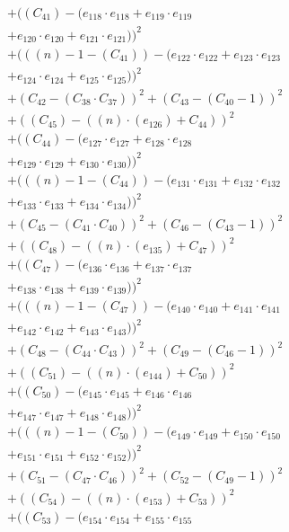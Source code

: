 \documentclass[10pt, a4paper]{article}
\begin{document}
\begin{align*}
& + ((C_{41}) - (e_{118} \cdot e_{118} + e_{119} \cdot e_{119} \\
& + e_{120} \cdot e_{120} + e_{121} \cdot e_{121}))^{2} \\
& + (((n) - 1 - (C_{41})) - (e_{122} \cdot e_{122} + e_{123} \cdot e_{123} \\
& + e_{124} \cdot e_{124} + e_{125} \cdot e_{125}))^{2} \\
& + (C_{42} - (C_{38}  \cdot  C_{37}))^{2} + (C_{43} - (C_{40} - 1))^{2} \\
& + ((C_{45}) - ((n)  \cdot  (e_{126}) + C_{44}))^{2} \\
& + ((C_{44}) - (e_{127} \cdot e_{127} + e_{128} \cdot e_{128} \\
& + e_{129} \cdot e_{129} + e_{130} \cdot e_{130}))^{2} \\
& + (((n) - 1 - (C_{44})) - (e_{131} \cdot e_{131} + e_{132} \cdot e_{132} \\
& + e_{133} \cdot e_{133} + e_{134} \cdot e_{134}))^{2} \\
& + (C_{45} - (C_{41}  \cdot  C_{40}))^{2} + (C_{46} - (C_{43} - 1))^{2} \\
& + ((C_{48}) - ((n)  \cdot  (e_{135}) + C_{47}))^{2} \\
& + ((C_{47}) - (e_{136} \cdot e_{136} + e_{137} \cdot e_{137} \\
& + e_{138} \cdot e_{138} + e_{139} \cdot e_{139}))^{2} \\
& + (((n) - 1 - (C_{47})) - (e_{140} \cdot e_{140} + e_{141} \cdot e_{141} \\
& + e_{142} \cdot e_{142} + e_{143} \cdot e_{143}))^{2} \\
& + (C_{48} - (C_{44}  \cdot  C_{43}))^{2} + (C_{49} - (C_{46} - 1))^{2} \\
& + ((C_{51}) - ((n)  \cdot  (e_{144}) + C_{50}))^{2} \\
& + ((C_{50}) - (e_{145} \cdot e_{145} + e_{146} \cdot e_{146} \\
& + e_{147} \cdot e_{147} + e_{148} \cdot e_{148}))^{2} \\
& + (((n) - 1 - (C_{50})) - (e_{149} \cdot e_{149} + e_{150} \cdot e_{150} \\
& + e_{151} \cdot e_{151} + e_{152} \cdot e_{152}))^{2} \\
& + (C_{51} - (C_{47}  \cdot  C_{46}))^{2} + (C_{52} - (C_{49} - 1))^{2} \\
& + ((C_{54}) - ((n)  \cdot  (e_{153}) + C_{53}))^{2} \\
& + ((C_{53}) - (e_{154} \cdot e_{154} + e_{155} \cdot e_{155} \\

\end{align*}
\end{document}
